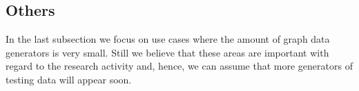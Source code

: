 \subsection{Others}
\label{sec:generators_others}

In the last subsection we focus on use cases where the amount of graph data generators is very small. Still we believe that these areas are important with regard to the research activity and, hence, we can assume that more generators of testing data will appear soon.









